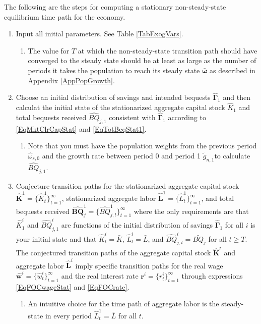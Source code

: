 \documentclass[letterpaper,12pt]{article}
\theoremstyle{definition}
\begin{document}
  The following are the steps for computing a stationary non-steady-state equilibrium time path for the economy.
  \begin{enumerate}
    \item Input all initial parameters. See Table \ref{TabExogVars}.
      \begin{enumerate}
        \item The value for $T$ at which the non-steady-state transition path should have converged to the steady state should be at least as large as the number of periods it takes the population to reach its steady state $\bm{\bar{\omega}}$ as described in Appendix \ref{AppPopGrowth}.
      \end{enumerate}

    \item Choose an initial distribution of savings and intended bequests $\bm{\hat{\Gamma}}_1$ and then calculat the initial state of the stationarized aggregate capital stock $\hat{K}_1$ and total bequests received $\hat{BQ}_{j,1}$ consistent with $\bm{\hat{\Gamma}}_1$ according to \eqref{EqMktClrCapStat} and \eqref{EqTotBeqStat1}.
      \begin{enumerate}
        \item Note that you must have the population weights from the previous period $\hat{\omega}_{s,0}$ and the growth rate between period 0 and period 1 $\tilde{g}_{n,1}$to calculate $\hat{BQ}_{j,1}$.
      \end{enumerate}
    \item Conjecture transition paths for the stationarized aggregate capital stock $\bm{\hat{K}}^1=\{\hat{K}^1_t\}_{t=1}^\infty$, stationarized aggregate labor $\bm{\hat{L}}^1=\{\hat{L}^1_t\}_{t=1}^\infty$, and total bequests received $\bm{\hat{BQ}}_j^1=\{\hat{BQ}^{1}_{j,t}\}_{t=1}^\infty$ where the only requirements are that $\hat{K}^i_1$ and $\hat{BQ}^i_{j,1}$ are functions of the initial distribution of savings $\bm{\hat{\Gamma}}_1$ for all $i$ is your initial state and that $\hat{K}^i_t=\bar{K}$, $\hat{L}^i_t=\bar{L}$, and $\hat{BQ}^i_{j,t}= \bar{BQ}_j$ for all $t\geq T$. The conjectured transition paths of the aggregate capital stock $\bm{\hat{K}}^i$ and aggregate labor $\bm{\hat{L}}^i$ imply specific transition paths for the real wage $\bm{\hat{w}}^i=\{\hat{w}^i_t\}_{t=1}^\infty$ and the real interest rate $\bm{r}^i=\{r^i_t\}_{t=1}^\infty$ through expressions \eqref{EqFOCwageStat} and \eqref{EqFOCrate}.
      \begin{enumerate}
        \item An intuitive choice for the time path of aggregate labor is the steady-state in every period $\hat{L}^1_t = \bar{L}$ for all $t$.

\end{enumerate}
\end{enumerate}
\end{document}
